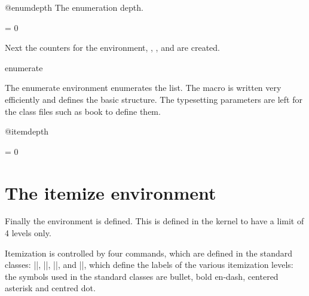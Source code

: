 \begin{texcode}{}{}
 \begin{docCommand}{@enumdepth}{}
  The enumeration depth. 
 \end{docCommand}
     \begin{teX}
\newcount\@enumdepth \@enumdepth = 0
    \end{teX}
 

Next the counters for the  environment, , ,  and  are created.

    \begin{teX}
    \end{teX}


 \begin{docEnvironment}{enumerate}{}{}
 \end{docEnvironment}  
   The enumerate environment enumerates the list. The macro
  is written very efficiently and defines the basic structure. The
  typesetting parameters are left for the class files such as book
  to define them.

     \begin{teX}
 \def\enumerate{%
  \ifnum \@enumdepth >\thr@@\@toodeep\else
    \advance\@enumdepth\@ne
    \edef\@enumctr{enum\romannumeral\the\@enumdepth}%
      \expandafter
      \list
         \csname label\@enumctr\endcsname
        {\usecounter\@enumctr\def\makelabel##1{\hss\llap{##1}}}%
  \fi}
    \end{teX}

    \begin{teX}
 \let\endenumerate =\endlist
    \end{teX}

 \begin{docCommand}{@itemdepth}{}
 \end{docCommand}
    \begin{teX}
\newcount\@itemdepth \@itemdepth = 0
    \end{teX}

\section{The itemize environment}

Finally the  environment is defined. This is defined in the kernel to have a limit of 4 levels only.

Itemization is controlled by four commands, which are defined in the standard classes: ||,
   ||, ||, and ||, which define
    the labels of the various itemization levels: the symbols used in the standard classes are
    bullet, bold en-dash, centered asterisk and centred dot.




\end{texcode}

